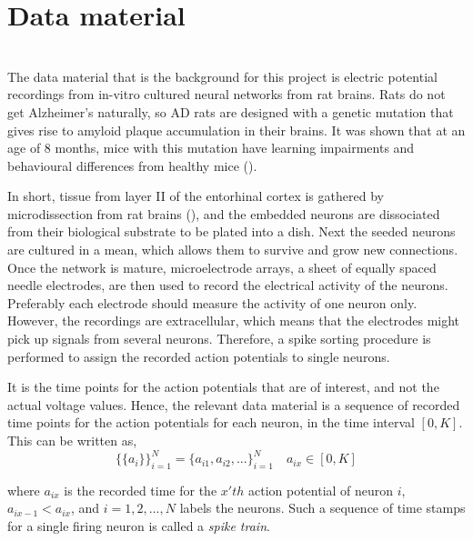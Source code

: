 \newpage

\section{Data material}

\label{Lab}\\
The data material that is the background for this project is electric potential recordings from in-vitro cultured neural networks from rat brains. Rats do not get Alzheimer's naturally, so AD rats are designed with a genetic mutation that gives rise to amyloid plaque accumulation in their brains. It was shown that at an age of 8 months, mice with this mutation have learning impairments and behavioural differences from healthy mice (\cite{Radde}). 

In short, tissue from layer II of the entorhinal cortex is gathered by microdissection from rat brains (\cite{Katrine}), and the embedded neurons are dissociated from their biological substrate to be plated into a dish. Next the seeded neurons are cultured in a mean, which allows them to survive and grow new connections. Once the network is mature, microelectrode arrays, a sheet of equally spaced needle electrodes, are then used to record the electrical activity of the neurons. Preferably each electrode should measure the activity of one neuron only. However, the recordings are extracellular, which means that the electrodes might pick up signals from several neurons. Therefore, a spike sorting procedure is performed to assign the recorded action potentials to single neurons. 

It is the time points for the action potentials that are of interest, and not the actual voltage values. Hence, the relevant data material is a sequence of recorded time points for the action potentials for each neuron, in the time interval $[0,K]$. This can be written as, 
\begin{equation}
\label{eq:AP}
    \{\{a_i\}\}_{i=1}^{N} = \{a_{i1}, a_{i2}, ...\}_{i=1}^{N} \quad a_{ix} \in [0,K]
\end{equation}

where $a_{ix}$ is the recorded time for the $x'th$ action potential of neuron $i$, $a_{ix-1} < a_{ix}$, and $i=1,2,...,N$ labels the neurons. Such a sequence of time stamps for a single firing neuron is called a \textit{spike train}.\\






\cleardoublepage